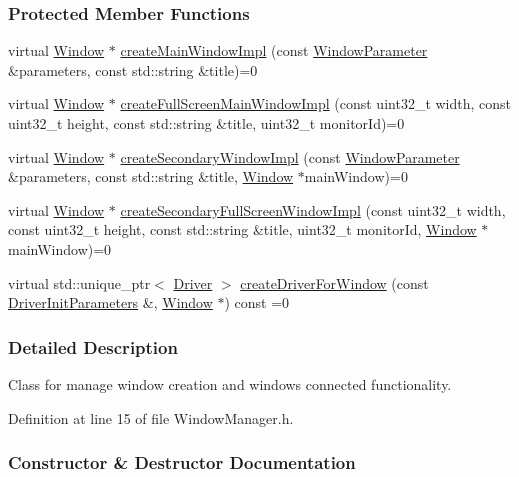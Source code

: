 \subsubsection*{Protected Member Functions}
\begin{DoxyCompactItemize}
\item 
virtual \hyperlink{a00082}{Window} $\ast$ \hyperlink{a00087_ad5dba47d5f1da2abfa9bacffd318ba3d}{create\+Main\+Window\+Impl} (const \hyperlink{a00091}{Window\+Parameter} \&parameters, const std\+::string \&title)=0
\item 
virtual \hyperlink{a00082}{Window} $\ast$ \hyperlink{a00087_a3af32a24c80a711eb8473d54876c4d28}{create\+Full\+Screen\+Main\+Window\+Impl} (const uint32\+\_\+t width, const uint32\+\_\+t height, const std\+::string \&title, uint32\+\_\+t monitor\+Id)=0
\item 
virtual \hyperlink{a00082}{Window} $\ast$ \hyperlink{a00087_a3944290d64b7d8f23764464f5f2df82f}{create\+Secondary\+Window\+Impl} (const \hyperlink{a00091}{Window\+Parameter} \&parameters, const std\+::string \&title, \hyperlink{a00082}{Window} $\ast$main\+Window)=0
\item 
virtual \hyperlink{a00082}{Window} $\ast$ \hyperlink{a00087_a62c22afc4f34aa5447f45239702ac67a}{create\+Secondary\+Full\+Screen\+Window\+Impl} (const uint32\+\_\+t width, const uint32\+\_\+t height, const std\+::string \&title, uint32\+\_\+t monitor\+Id, \hyperlink{a00082}{Window} $\ast$main\+Window)=0
\item 
virtual std\+::unique\+\_\+ptr$<$ \hyperlink{a00024}{Driver} $>$ \hyperlink{a00087_a640d280cbddc70431a12c6ffb8fb34fd}{create\+Driver\+For\+Window} (const \hyperlink{a00028}{Driver\+Init\+Parameters} \&, \hyperlink{a00082}{Window} $\ast$) const  =0
\end{DoxyCompactItemize}


\subsubsection{Detailed Description}
Class for manage window creation and windows connected functionality. 

Definition at line 15 of file Window\+Manager.\+h.



\subsubsection{Constructor \& Destructor Documentation}
